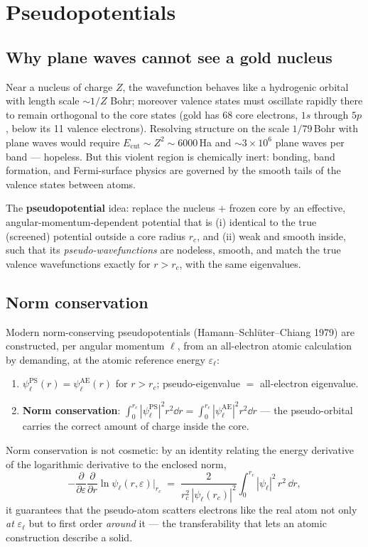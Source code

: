 \chapter{Pseudopotentials}
\label{ch:pseudo}

\section{Why plane waves cannot see a gold nucleus}

Near a nucleus of charge $Z$, the wavefunction behaves like a hydrogenic
orbital with length scale $\sim 1/Z$ Bohr; moreover valence states must
oscillate rapidly there to remain orthogonal to the core states (gold has 68
core electrons, $1s$ through $5p$, below its 11 valence electrons). Resolving structure on the scale
$1/79$\,Bohr with plane waves would require $E_{\mathrm{cut}} \sim Z^2 \sim
6000$\,Ha and $\sim 3\times10^6$ plane waves per band --- hopeless. But this violent
region is chemically inert: bonding, band formation, and Fermi-surface
physics are governed by the smooth tails of the valence states between atoms.

The \textbf{pseudopotential} idea: replace the nucleus + frozen core by an
effective, angular-momentum-dependent potential that is (i) identical to the
true (screened) potential outside a core radius $r_c$, and (ii) weak and
smooth inside, such that its \emph{pseudo-wavefunctions} are nodeless, smooth,
and match the true valence wavefunctions exactly for $r > r_c$, with the same
eigenvalues.

\section{Norm conservation}

Modern norm-conserving pseudopotentials (Hamann--Schl\"uter--Chiang 1979) are
constructed, per angular momentum $\ell$, from an all-electron atomic
calculation by demanding, at the atomic reference energy
$\varepsilon_\ell$:
\begin{enumerate}[leftmargin=2em]
\item $\psi^{\mathrm{PS}}_\ell(r) = \psi^{\mathrm{AE}}_\ell(r)$ for $r > r_c$;
pseudo-eigenvalue $=$ all-electron eigenvalue.
\item \textbf{Norm conservation}: $\displaystyle\int_0^{r_c}
|\psi^{\mathrm{PS}}_\ell|^2 r^2 \dd r = \int_0^{r_c}
|\psi^{\mathrm{AE}}_\ell|^2 r^2 \dd r$ --- the pseudo-orbital carries the
correct amount of charge inside the core.
\end{enumerate}
Norm conservation is not cosmetic: by an identity relating the energy
derivative of the logarithmic derivative to the enclosed norm,
\begin{equation}
-\frac{\partial}{\partial \varepsilon}
\frac{\partial}{\partial r} \ln \psi_\ell(r, \varepsilon)\Big|_{r_c}
\;=\; \frac{2}{r_c^2\, |\psi_\ell(r_c)|^2} \int_0^{r_c}
|\psi_\ell|^2\, r^2\, \dd r,
\end{equation}
it guarantees that the pseudo-atom scatters electrons like the real atom not
only \emph{at} $\varepsilon_\ell$ but to first order \emph{around} it ---
the transferability that lets an atomic construction describe a solid.

